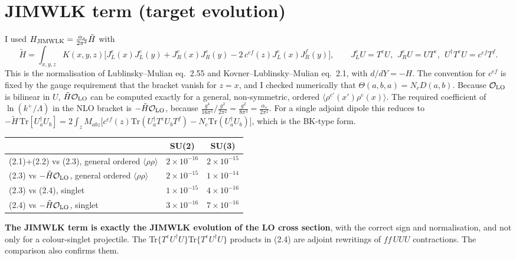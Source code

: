 \documentclass[10pt]{article}
\newcommand{\Tr}{\mathrm{Tr}}
\begin{document}
\section{JIMWLK term (target evolution)}\label{sec:jimwlk}
I used $H_{\rm JIMWLK}=\frac{\alpha_s}{2\pi^2}\tilde H$ with
\[
\tilde H=\int_{x,y,z}K(x,y,z)\Big[J_L^e(x)J_L^e(y)+J_R^e(x)J_R^e(y)-2\,c^{ef}(z)J_L^e(x)J_R^f(y)\Big],\qquad
J_L^eU=T^eU,\ \ J_R^eU=UT^e,\ \ U^\dagger T^eU=c^{ef}T^f .
\]
This is the normalisation of Lublinsky--Mulian eq.~2.55 and Kovner--Lublinsky--Mulian eq.~2.1, with $d/dY=-H$. The convention for $c^{ef}$ is fixed
by the gauge requirement that the bracket vanish for $z=x$, and I checked numerically that $\Theta(a,b,a)=N_cD(a,b)$. Because $\mathcal O_{\rm LO}$ is bilinear
in $U$, $\tilde H\mathcal O_{\rm LO}$ can be computed exactly for a general, non-symmetric, ordered $\langle\rho^{e'}(x')\rho^e(x)\rangle$. The required
coefficient of $\ln(k^+/\Lambda)$ in the NLO bracket is $-\tilde H\mathcal O_{\rm LO}$, because $\frac{g^4}{16\pi^5}/\frac{g^2}{2\pi^2}=\frac{g^2}{8\pi^3}=\frac{\alpha_s}{2\pi^2}$.
For a single adjoint dipole this reduces to $-\tilde H\,\Tr[U_a^\dagger U_b]=2\int_zM_{abz}\big[c^{ef}(z)\Tr(U_a^\dagger T^eU_bT^f)-N_c\Tr(U_a^\dagger U_b)\big]$,
which is the BK-type form.

\begin{center}
\begin{tabular}{lcc}
\toprule
 & SU(2) & SU(3)\\
\midrule
(2.1)+(2.2) vs (2.3), general ordered $\langle\rho\rho\rangle$ & $2\times10^{-16}$ & $2\times10^{-15}$\\
(2.3) vs $-\tilde H\mathcal O_{\rm LO}$, general ordered $\langle\rho\rho\rangle$ & $2\times10^{-15}$ & $1\times10^{-14}$\\
(2.3) vs (2.4), singlet & $1\times10^{-15}$ & $4\times10^{-16}$\\
(2.4) vs $-\tilde H\mathcal O_{\rm LO}$, singlet & $3\times10^{-16}$ & $7\times10^{-16}$\\
\bottomrule
\end{tabular}
\end{center}
\textbf{The JIMWLK term is exactly the JIMWLK evolution of the LO cross section}, with the correct sign and normalisation, and not only
for a colour-singlet projectile. The Tr$\{T^eU^\dagger U\}$Tr$\{T^eU^\dagger U\}$ products in (2.4) are adjoint rewritings of $ff\,UUU$
contractions. The comparison also confirms them.
\end{document}
